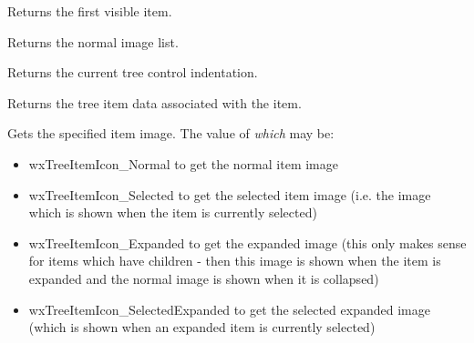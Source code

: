 
Returns the first visible item.

\label{wxtreectrlgetimagelist}


Returns the normal image list.

\label{wxtreectrlgetindent}


Returns the current tree control indentation.

\label{wxtreectrlgetitemdata}


Returns the tree item data associated with the item.





\label{wxtreectrlgetitemimage}


Gets the specified item image. The value of {\it which} may be:

\begin{itemize}\itemsep=0pt
\item{wxTreeItemIcon\_Normal} to get the normal item image
\item{wxTreeItemIcon\_Selected} to get the selected item image (i.e. the image
which is shown when the item is currently selected)
\item{wxTreeItemIcon\_Expanded} to get the expanded image (this only
makes sense for items which have children - then this image is shown when the
item is expanded and the normal image is shown when it is collapsed)
\item{wxTreeItemIcon\_SelectedExpanded} to get the selected expanded image
(which is shown when an expanded item is currently selected)
\end{itemize}

